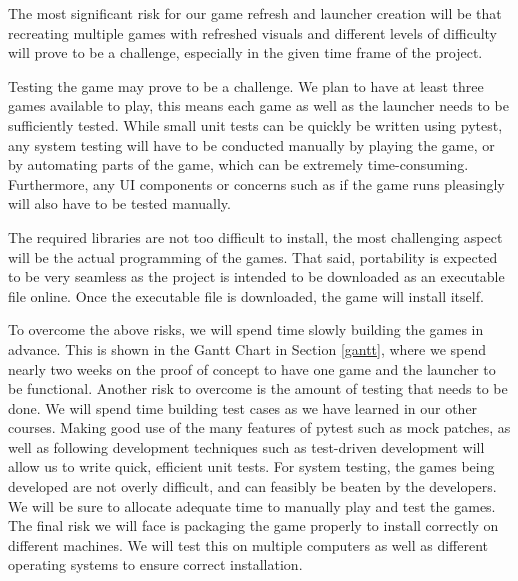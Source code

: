 \documentclass{article}
\begin{document}
The most significant risk for our game refresh and launcher creation will be that recreating multiple games with refreshed visuals and different levels of difficulty will prove to be a challenge, especially in the given time frame of the project.

\iffalse
Also, we may find testing to be in the middle between manageable and complicated. On one hand, running pytest for some unit tests will be simple but on the other, usability tests, such as if the games and launcher will run pleasingly, will need to be conducted manually and may more time than expected.
\fi

Testing the game may prove to be a challenge. We plan to have at least three games available to play, this means each game as well as the launcher needs to be sufficiently tested.  While small unit tests can be quickly be written using pytest, any system testing will have to be conducted manually by playing the game, or by automating parts of the game, which can be extremely time-consuming. Furthermore, any UI components or concerns such as if the game runs pleasingly will also have to be tested manually.

The required libraries are not too difficult to install, the most challenging aspect will be the actual programming of the games. That said, portability is expected to be very seamless as the project is intended to be downloaded as an executable file online. Once the executable file is downloaded, the game will install itself.

To overcome the above risks, we will spend time slowly building the games in advance. This is shown in the Gantt Chart in Section \ref{gantt}, where we spend nearly two weeks on the proof of concept to have one game and the launcher to be functional. Another risk to overcome is the amount of testing that needs to be done.  We will spend time building test cases as we have learned in our other courses. Making good use of the many features of pytest such as mock patches, as well as following development techniques such as test-driven development will allow us to write quick, efficient unit tests. For system testing, the games being developed are not overly difficult, and can feasibly be beaten by the developers. We will be sure to allocate adequate time to manually play and test the games. The final risk we will face is packaging the game properly to install correctly on different machines. We will test this on multiple computers as well as different operating systems to ensure correct installation.
\end{document}
